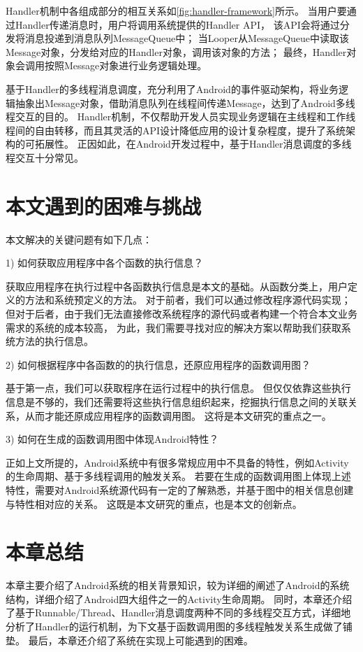 Handler机制中各组成部分的相互关系如\autoref{fig:handler-framework}所示。
当用户要通过Handler传递消息时，用户将调用系统提供的Handler API，
该API会将通过分发将消息投递到消息队列MessageQueue中；
当Looper从MessageQueue中读取该Message对象，分发给对应的Handler对象，调用该对象的方法；%
最终，Handler对象会调用按照Message对象进行业务逻辑处理。

基于Handler的多线程消息调度，充分利用了Android的事件驱动架构，将业务逻辑抽象出Message对象，借助消息队列在线程间传递Message，达到了Android多线程交互的目的。
Handler机制，不仅帮助开发人员实现业务逻辑在主线程和工作线程间的自由转移，而且其灵活的API设计降低应用的设计复杂程度，提升了系统架构的可拓展性。
正因如此，在Android开发过程中，基于Handler消息调度的多线程交互十分常见。


\section{本文遇到的困难与挑战}


本文解决的关键问题有如下几点：

1)	如何获取应用程序中各个函数的执行信息？

获取应用程序在执行过程中各函数执行信息是本文的基础。从函数分类上，用户定义的方法和系统预定义的方法。
对于前者，我们可以通过修改程序源代码实现；但对于后者，由于我们无法直接修改系统程序的源代码或者构建一个符合本文业务需求的系统的成本较高，
为此，我们需要寻找对应的解决方案以帮助我们获取系统方法的执行信息。

2)	如何根据程序中各函数的的执行信息，还原应用程序的函数调用图？

基于第一点，我们可以获取程序在运行过程中的执行信息。
但仅仅依靠这些执行信息是不够的，我们还需要将这些执行信息组织起来，挖掘执行信息之间的关联关系，从而才能还原成应用程序的函数调用图。
这将是本文研究的重点之一。

3)	如何在生成的函数调用图中体现Android特性？

正如上文所提的，Android系统中有很多常规应用中不具备的特性，例如Activity的生命周期、基于多线程调用的触发关系。
若要在生成的函数调用图上体现上述特性，需要对Android系统源代码有一定的了解熟悉，并基于图中的相关信息创建与特性相对应的关系。
这既是本文研究的重点，也是本文的创新点。

\section{本章总结}

本章主要介绍了Android系统的相关背景知识，较为详细的阐述了Android的系统结构，详细介绍了Android四大组件之一的Activity生命周期。
同时，本章还介绍了基于Runnable/Thread、Handler消息调度两种不同的多线程交互方式，详细地分析了Handler的运行机制，为下文基于函数调用图的多线程触发关系生成做了铺垫。
最后，本章还介绍了系统在实现上可能遇到的困难。
